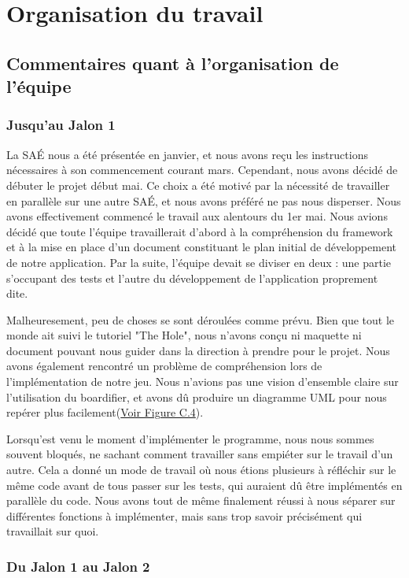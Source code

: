 \section{Organisation du travail}

\subsection{Commentaires quant à l'organisation de l'équipe}

\subsubsection{Jusqu'au Jalon 1}

La SAÉ nous a été présentée en janvier, et nous avons reçu les instructions nécessaires à son commencement courant mars.
Cependant, nous avons décidé de débuter le projet début mai.
Ce choix a été motivé par la nécessité de travailler en parallèle sur une autre SAÉ, et nous avons préféré ne pas nous disperser.
Nous avons effectivement commencé le travail aux alentours du 1er mai.
Nous avions décidé que toute l'équipe travaillerait d'abord à la compréhension du framework et à la mise en place d'un document constituant le plan initial de développement de notre application.
Par la suite, l'équipe devait se diviser en deux : une partie s'occupant des tests et l'autre du développement de l'application proprement dite.

Malheuresement, peu de choses se sont déroulées comme prévu.
Bien que tout le monde ait suivi le tutoriel "The Hole", nous n'avons conçu ni maquette ni document pouvant nous guider dans la direction à prendre pour le projet.
Nous avons également rencontré un problème de compréhension lors de l'implémentation de notre jeu.
Nous n'avions pas une vision d'ensemble claire sur l'utilisation du boardifier, et avons dû produire un diagramme UML pour nous repérer plus facilement(\hyperref[fig:uml]{Voir Figure C.4}).

Lorsqu'est venu le moment d'implémenter le programme, nous nous sommes souvent bloqués, ne sachant comment travailler sans empiéter sur le travail d'un autre.
Cela a donné un mode de travail où nous étions plusieurs à réfléchir sur le même code avant de tous passer sur les tests, qui auraient dû être implémentés en parallèle du code.
Nous avons tout de même finalement réussi à nous séparer sur différentes fonctions à implémenter, mais sans trop savoir précisément qui travaillait sur quoi.

\subsubsection{Du Jalon 1 au Jalon 2}

